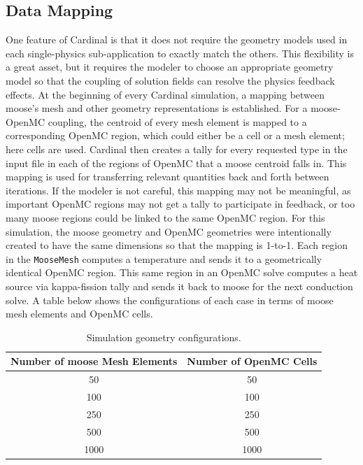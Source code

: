 \documentclass[letterpaper]{mc2023}
\begin{document}
\subsection{Data Mapping}
One feature of Cardinal is that it does not require the geometry models used in each single-physics sub-application to exactly match the
others. This flexibility is a great asset, but it requires the modeler to choose an appropriate geometry model so that the coupling of
solution fields can resolve the physics feedback effects. At the beginning of every Cardinal simulation, a mapping between \gls{moose}'s mesh
and other geometry representations is established. For a \gls{moose}-OpenMC coupling, the centroid of every mesh element is mapped to
a corresponding OpenMC region, which could either be a cell or a mesh element; here cells are used. Cardinal then creates a tally for every
requested type in the input file in each of the regions of OpenMC that a \gls{moose} centroid falls in. This mapping is used for transferring
relevant quantities back and forth between iterations. If the modeler is not careful, this mapping may not be meaningful, as important OpenMC
regions may not get a tally to participate in feedback, or too many \gls{moose} regions could be linked to the same OpenMC region. For this
simulation, the \gls{moose} geometry and OpenMC geometries were intentionally created to have the same dimensions so that the mapping is
1-to-1. Each region in the \texttt{MooseMesh} computes a temperature and sends it to a geometrically identical OpenMC region. This same
region in an OpenMC solve computes a heat source via kappa-fission tally and sends it back to \gls{moose} for the next conduction solve.
A table below shows the configurations of each case in terms of \gls{moose} mesh elements and OpenMC cells.
\begin{table}[H]
    \caption{Simulation geometry configurations.}
    \begin{adjustbox}{width=0.59\columnwidth,center}
    \centering
    \begin{tabular}{@{}cc@{}}
        \toprule
            Number of \gls{moose} Mesh Elements & Number of OpenMC Cells \\
        \midrule
            50 & 50 \\
            100 & 100 \\
            250 & 250 \\
            500 & 500 \\
            1000 & 1000 \\
        \bottomrule
    \end{tabular}
    \end{adjustbox}
\end{table}
\end{document}
